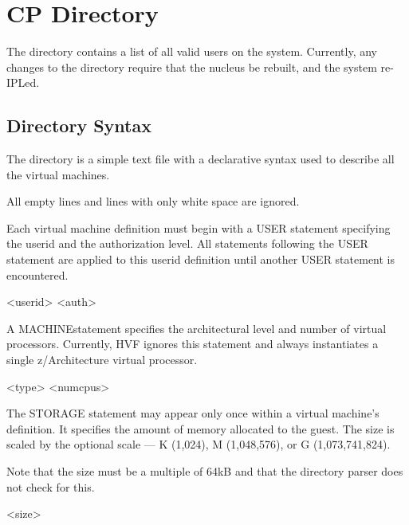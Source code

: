 \chapter{CP Directory}
\label{chap:directory}
The directory contains a list of all valid users on the system.  Currently,
any changes to the directory require that the nucleus be rebuilt, and the
system re-IPLed.

\section{Directory Syntax}
The directory is a simple text file with a declarative syntax used to
describe all the virtual machines.

All empty lines and lines with only white space are ignored.

\cbstart
Each virtual machine definition must begin with a USER statement specifying
the userid and the authorization level.  All statements following the USER
statement are applied to this userid definition until another USER statement
is encountered.

\begin{syntdiag}
 <userid> <auth>
\end{syntdiag}
\cbend

A \cbstart MACHINE\cbend statement specifies the architectural level and
number of virtual processors.  Currently, HVF ignores this statement and
always instantiates a single z/Architecture virtual processor.

\cbstart
\begin{syntdiag}
 <type> <numcpus>
\end{syntdiag}
\cbend

The STORAGE statement may appear only once within a virtual machine's
definition.  It specifies the amount of memory allocated to the guest.  The
size is scaled by the optional scale --- K (\mbox{1,024}), M
(\mbox{1,048,576}), or G (\mbox{1,073,741,824}).

Note that the size must be a multiple of 64kB and that the directory parser
does not check for this.

\begin{syntdiag}
 <size>
\begin{stack}
	\\
	 \\
	 \\
\end{stack}
\end{syntdiag}

